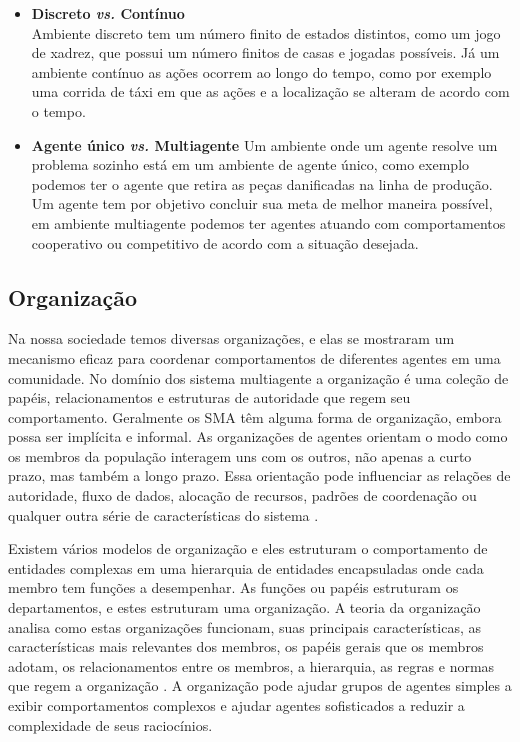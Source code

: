 \begin{itemize}
\item \textbf{Discreto \textit{vs.} Contínuo} \\
Ambiente discreto tem um número finito de estados distintos, como um jogo de xadrez, que possui um número finitos de casas e jogadas possíveis. Já um ambiente contínuo as ações ocorrem ao longo do tempo, como por exemplo uma corrida de táxi em que as ações e a localização se alteram de acordo com o tempo.

\item \textbf{Agente único \textit{vs.} Multiagente}
Um ambiente onde um agente resolve um problema sozinho está em um ambiente de agente único, como exemplo podemos ter o agente que retira as peças danificadas na linha de produção. Um agente tem por objetivo concluir sua meta de melhor maneira possível, em ambiente multiagente podemos ter agentes atuando com comportamentos cooperativo ou competitivo de acordo com a situação desejada.
\end{itemize}

\subsection{Organização}\label{sec:orgsma}

  Na nossa sociedade temos diversas organizações, e elas se mostraram um mecanismo eficaz para coordenar comportamentos de diferentes agentes em uma comunidade. No domínio dos sistema multiagente a organização é uma coleção de papéis, relacionamentos e estruturas de autoridade que regem seu comportamento. Geralmente os SMA têm alguma forma de organização, embora possa ser implícita e informal. As organizações de agentes orientam o modo como os membros da população interagem uns com os outros, não apenas a curto prazo, mas também a longo prazo. Essa orientação pode influenciar as relações de autoridade, fluxo de dados, alocação de recursos, padrões de coordenação ou qualquer outra série de características do sistema \cite{horling2004survey}.

Existem vários modelos de organização e eles estruturam o comportamento de entidades complexas em uma hierarquia de entidades encapsuladas onde cada membro tem funções a desempenhar. As funções ou papéis estruturam os departamentos, e estes estruturam uma organização. A teoria da organização analisa como estas organizações funcionam, suas principais características, as características mais relevantes dos membros, os papéis gerais que os membros adotam, os relacionamentos entre os membros, a hierarquia, as regras e normas que regem a organização \cite{argente2006multi}. A organização pode ajudar grupos de agentes simples a exibir comportamentos complexos e ajudar agentes sofisticados a reduzir a complexidade de seus raciocínios. %

